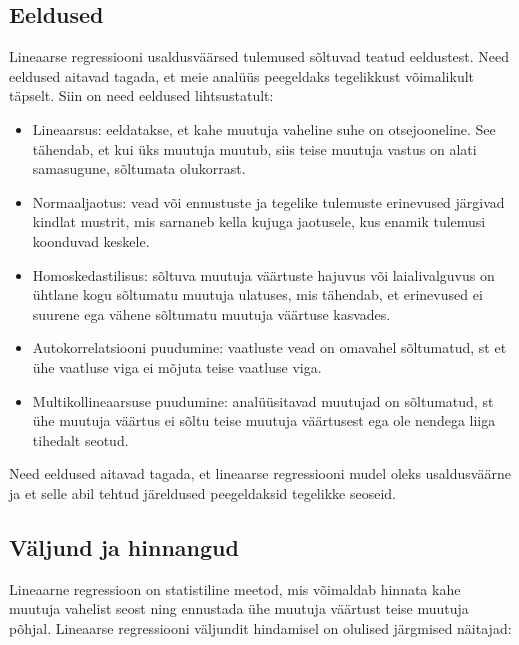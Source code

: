 \documentclass[
]{book}
\begin{document}
\subsection{Eeldused}\label{eeldused}

Lineaarse regressiooni usaldusväärsed tulemused sõltuvad teatud eeldustest. Need eeldused aitavad tagada, et meie analüüs peegeldaks tegelikkust võimalikult täpselt. Siin on need eeldused lihtsustatult:

\begin{itemize}
\item
  Lineaarsus: eeldatakse, et kahe muutuja vaheline suhe on otsejooneline. See tähendab, et kui üks muutuja muutub, siis teise muutuja vastus on alati samasugune, sõltumata olukorrast.
\item
  Normaaljaotus: vead või ennustuste ja tegelike tulemuste erinevused järgivad kindlat mustrit, mis sarnaneb kella kujuga jaotusele, kus enamik tulemusi koonduvad keskele.
\item
  Homoskedastilisus: sõltuva muutuja väärtuste hajuvus või laialivalguvus on ühtlane kogu sõltumatu muutuja ulatuses, mis tähendab, et erinevused ei suurene ega vähene sõltumatu muutuja väärtuse kasvades.
\item
  Autokorrelatsiooni puudumine: vaatluste vead on omavahel sõltumatud, st et ühe vaatluse viga ei mõjuta teise vaatluse viga.
\item
  Multikollineaarsuse puudumine: analüüsitavad muutujad on sõltumatud, st ühe muutuja väärtus ei sõltu teise muutuja väärtusest ega ole nendega liiga tihedalt seotud.
\end{itemize}

Need eeldused aitavad tagada, et lineaarse regressiooni mudel oleks usaldusväärne ja et selle abil tehtud järeldused peegeldaksid tegelikke seoseid.

\subsection{Väljund ja hinnangud}\label{vuxe4ljund-ja-hinnangud}

Lineaarne regressioon on statistiline meetod, mis võimaldab hinnata kahe muutuja vahelist seost ning ennustada ühe muutuja väärtust teise muutuja põhjal. Lineaarse regressiooni väljundit hindamisel on olulised järgmised näitajad:
\end{document}
